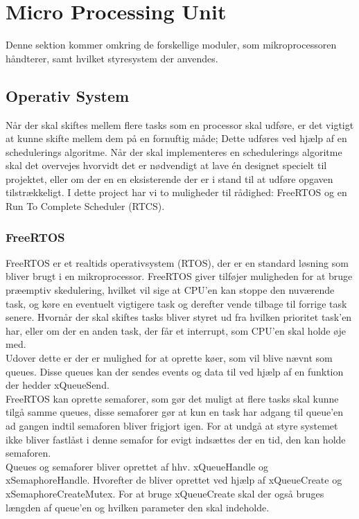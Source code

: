 \section{Micro Processing Unit}
Denne sektion kommer omkring de forskellige moduler, som mikroprocessoren håndterer, samt hvilket styresystem der anvendes.

\subsection{Operativ System}
Når der skal skiftes mellem flere tasks som en processor skal udføre, er det vigtigt at kunne skifte mellem dem på en fornuftig måde; Dette udføres ved hjælp af en schedulerings algoritme. Når der skal implementeres en schedulerings algoritme skal det overvejes hvorvidt det er nødvendigt at lave én designet specielt til projektet, eller om der en en eksisterende der er i stand til at udføre opgaven tilstrækkeligt. I dette project har vi to muligheder til rådighed: FreeRTOS\cite{FreeRTOSorg} og en Run To Complete Scheduler (RTCS).

\subsubsection{FreeRTOS}

FreeRTOS \cite{FreeRTOSorg} er et realtids operativsystem (RTOS), der er en standard løsning som bliver brugt i en mikroprocessor. FreeRTOS giver tilføjer muligheden for at bruge præemptiv skedulering, hvilket vil sige at CPU'en kan stoppe den nuværende task, og køre en eventuelt vigtigere task og derefter vende tilbage til forrige task senere. Hvornår der skal skiftes tasks bliver styret ud fra hvilken prioritet task'en har, eller om der en anden task, der får et interrupt, som CPU'en skal holde øje med.
\\
Udover dette er der er mulighed for at oprette køer, som vil blive nævnt som queues. Disse queues kan der sendes events og data til ved hjælp af en funktion der hedder xQueueSend. 
\\
FreeRTOS kan oprette semaforer, som gør det muligt at flere tasks skal kunne tilgå samme queues, disse semaforer gør at kun en task har adgang til queue'en ad gangen indtil semaforen bliver frigjort igen. For at undgå at styre systemet ikke bliver fastlåst i denne semafor for evigt indsættes der en tid, den kan holde semaforen.
\\
Queues og semaforer bliver oprettet af hhv. xQueueHandle og xSemaphoreHandle. Hvorefter de bliver oprettet ved hjælp af xQueueCreate og xSemaphoreCreateMutex. For at bruge xQueueCreate skal der også bruges længden af queue'en og hvilken parameter den skal indeholde.
\\

